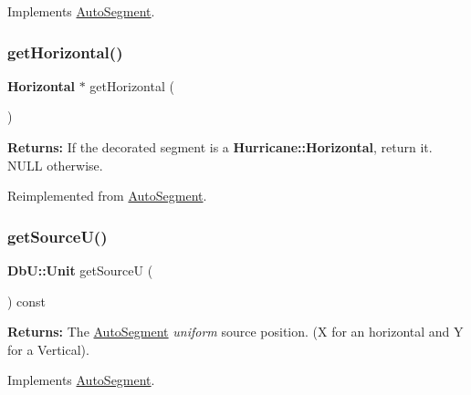 Implements \mbox{\hyperlink{classKatabatic_1_1AutoSegment_a53877ff5ef48eb0030c2581a6eeb3c09}{Auto\+Segment}}.

\mbox{\label{classKatabatic_1_1AutoHorizontal_a659b8ed90de679564924afe07af478de}} 
\subsubsection{\texorpdfstring{get\+Horizontal()}{getHorizontal()}}
{\footnotesize\ttfamily \textbf{ Horizontal} $\ast$ get\+Horizontal (\begin{DoxyParamCaption}{ }\end{DoxyParamCaption})\hspace{0.3cm}{\ttfamily [virtual]}}

{\bfseries Returns\+:} If the decorated segment is a \textbf{ Hurricane\+::\+Horizontal}, return it. {\ttfamily N\+U\+LL} otherwise. 

Reimplemented from \mbox{\hyperlink{classKatabatic_1_1AutoSegment_a659b8ed90de679564924afe07af478de}{Auto\+Segment}}.

\mbox{\label{classKatabatic_1_1AutoHorizontal_ad521ffba761b0e81b7b81b99d62f76f9}} 
\subsubsection{\texorpdfstring{get\+Source\+U()}{getSourceU()}}
{\footnotesize\ttfamily \textbf{ Db\+U\+::\+Unit} get\+SourceU (\begin{DoxyParamCaption}{ }\end{DoxyParamCaption}) const\hspace{0.3cm}{\ttfamily [virtual]}}

{\bfseries Returns\+:} The \mbox{\hyperlink{classKatabatic_1_1AutoSegment}{Auto\+Segment}} {\itshape uniform} source position. (X for an horizontal and Y for a Vertical). 

Implements \mbox{\hyperlink{classKatabatic_1_1AutoSegment_aeaa1543880686755e389c4807128428f}{Auto\+Segment}}.



